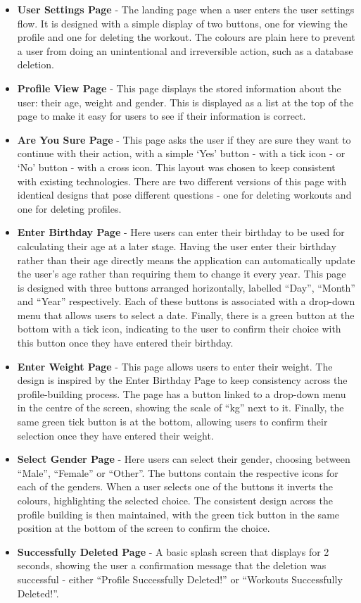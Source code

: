 \documentclass{l4proj}
\begin{document}
\begin{itemize}
    \item \textbf{User Settings Page} - The landing page when a user enters the user settings flow. It is designed with a simple display of two buttons, one for viewing the profile and one for deleting the workout. The colours are plain here to prevent a user from doing an unintentional and irreversible action, such as a database deletion.
    \item \textbf{Profile View Page} - This page displays the stored information about the user: their age, weight and gender. This is displayed as a list at the top of the page to make it easy for users to see if their information is correct.
    \item \textbf{Are You Sure Page} - This page asks the user if they are sure they want to continue with their action, with a simple ‘Yes’ button - with a tick icon - or ‘No’ button - with a cross icon. This layout was chosen to keep consistent with existing technologies. There are two different versions of this page with identical designs that pose different questions - one for deleting workouts and one for deleting profiles.
    \item \textbf{Enter Birthday Page} - Here users can enter their birthday to be used for calculating their age at a later stage. Having the user enter their birthday rather than their age directly means the application can automatically update the user’s age rather than requiring them to change it every year. This page is designed with three buttons arranged horizontally, labelled “Day”, “Month” and “Year” respectively. Each of these buttons is associated with a drop-down menu that allows users to select a date. Finally, there is a green button at the bottom with a tick icon, indicating to the user to confirm their choice with this button once they have entered their birthday.
    \item \textbf{Enter Weight Page} - This page allows users to enter their weight. The design is inspired by the Enter Birthday Page to keep consistency across the profile-building process. The page has a button linked to a drop-down menu in the centre of the screen, showing the scale of “kg” next to it. Finally, the same green tick button is at the bottom, allowing users to confirm their selection once they have entered their weight.
    \item \textbf{Select Gender Page} - Here users can select their gender, choosing between “Male”, “Female” or “Other”. The buttons contain the respective icons for each of the genders. When a user selects one of the buttons it inverts the colours, highlighting the selected choice. The consistent design across the profile building is then maintained, with the green tick button in the same position at the bottom of the screen to confirm the choice.
    \item \textbf{Successfully Deleted Page} - A basic splash screen that displays for 2 seconds, showing the user a confirmation message that the deletion was successful - either “Profile Successfully Deleted!” or “Workouts Successfully Deleted!”.
\end{itemize}
\end{document}
